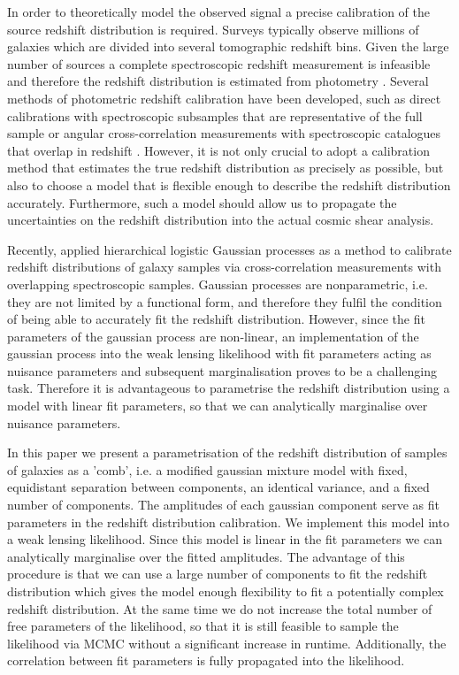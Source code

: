 \documentclass{aa}
\begin{document}
 In order to theoretically model the observed signal a precise calibration of the source redshift distribution is required. Surveys typically observe millions of galaxies which are divided into several tomographic redshift bins. Given the large number of sources a complete spectroscopic redshift measurement is infeasible and therefore the redshift distribution is estimated from photometry \citep{2019NatAs...3..212S}. Several methods of photometric redshift calibration have been developed, such as direct calibrations with spectroscopic subsamples that are representative of the full sample \citep{Lima, Bonnett, 2017MNRAS.465.1454H} or angular cross-correlation measurements with spectroscopic catalogues that overlap in redshift \cite[e.g. ][]{Newman08,MatthewsNewman, Menard}. However, it is not only crucial to adopt a calibration method that estimates the true redshift distribution as precisely as possible, but also to choose a model that is flexible enough to describe the redshift distribution accurately. Furthermore, such a model should allow us to propagate the uncertainties on the redshift distribution into the actual cosmic shear analysis. 
 
 Recently, \cite{2020MNRAS.491.4768R} applied hierarchical logistic Gaussian processes as a method to calibrate redshift distributions of galaxy samples via cross-correlation measurements with overlapping spectroscopic samples. Gaussian processes are nonparametric, i.e. they are not limited by a functional form, and therefore they fulfil the condition of being able to accurately fit the redshift distribution. However, since the fit parameters of the gaussian process are non-linear, an implementation of the gaussian process into the weak lensing likelihood with fit parameters acting as nuisance parameters and subsequent marginalisation proves to be a challenging task. Therefore it is advantageous to parametrise the redshift distribution using a model with linear fit parameters, so that we can analytically marginalise over nuisance parameters.

In this paper we present a parametrisation of the redshift distribution of samples of galaxies as a 'comb', i.e. a modified gaussian mixture model with fixed, equidistant separation between components, an identical variance, and a fixed number of components. The amplitudes of each gaussian component serve as fit parameters in the redshift distribution calibration. We implement this model into a weak lensing likelihood. Since this model is linear in the fit parameters we can analytically marginalise over the fitted amplitudes. The advantage of this procedure is that we can use a large number of components to fit the redshift distribution which gives the model enough flexibility to fit a potentially complex redshift distribution. At the same time we do not increase the total number of free parameters of the likelihood, so that it is still feasible to sample the likelihood via MCMC without a significant increase in runtime. Additionally, the correlation between fit parameters is fully propagated into the likelihood.
\end{document}
